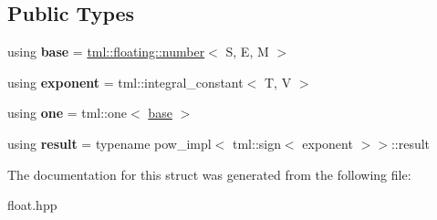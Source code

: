 \subsection*{Public Types}
\begin{DoxyCompactItemize}
\item 
\hypertarget{structtml_1_1pow_3_01tml_1_1floating_1_1number_3_01S_00_01E_00_01M_01_4_00_01tml_1_1integral__constant_3_01T_00_01V_01_4_01_4_acdddd99beb91791807a6b41fd77fa04d}{using {\bfseries base} = \hyperlink{structtml_1_1floating_1_1number}{tml\+::floating\+::number}$<$ S, E, M $>$}\label{structtml_1_1pow_3_01tml_1_1floating_1_1number_3_01S_00_01E_00_01M_01_4_00_01tml_1_1integral__constant_3_01T_00_01V_01_4_01_4_acdddd99beb91791807a6b41fd77fa04d}

\item 
\hypertarget{structtml_1_1pow_3_01tml_1_1floating_1_1number_3_01S_00_01E_00_01M_01_4_00_01tml_1_1integral__constant_3_01T_00_01V_01_4_01_4_ad25d9100351e313d9ab47c5d1cd6f9f6}{using {\bfseries exponent} = tml\+::integral\+\_\+constant$<$ T, V $>$}\label{structtml_1_1pow_3_01tml_1_1floating_1_1number_3_01S_00_01E_00_01M_01_4_00_01tml_1_1integral__constant_3_01T_00_01V_01_4_01_4_ad25d9100351e313d9ab47c5d1cd6f9f6}

\item 
\hypertarget{structtml_1_1pow_3_01tml_1_1floating_1_1number_3_01S_00_01E_00_01M_01_4_00_01tml_1_1integral__constant_3_01T_00_01V_01_4_01_4_a5472303f4e70dd2f0cf0586e61e183f7}{using {\bfseries one} = tml\+::one$<$ \hyperlink{structtml_1_1floating_1_1number}{base} $>$}\label{structtml_1_1pow_3_01tml_1_1floating_1_1number_3_01S_00_01E_00_01M_01_4_00_01tml_1_1integral__constant_3_01T_00_01V_01_4_01_4_a5472303f4e70dd2f0cf0586e61e183f7}

\item 
\hypertarget{structtml_1_1pow_3_01tml_1_1floating_1_1number_3_01S_00_01E_00_01M_01_4_00_01tml_1_1integral__constant_3_01T_00_01V_01_4_01_4_a3af982a1fb53e741de7e277b1aa870b0}{using {\bfseries result} = typename pow\+\_\+impl$<$ tml\+::sign$<$ exponent $>$$>$\+::result}\label{structtml_1_1pow_3_01tml_1_1floating_1_1number_3_01S_00_01E_00_01M_01_4_00_01tml_1_1integral__constant_3_01T_00_01V_01_4_01_4_a3af982a1fb53e741de7e277b1aa870b0}

\end{DoxyCompactItemize}


The documentation for this struct was generated from the following file\+:\begin{DoxyCompactItemize}
\item 
float.\+hpp\end{DoxyCompactItemize}
